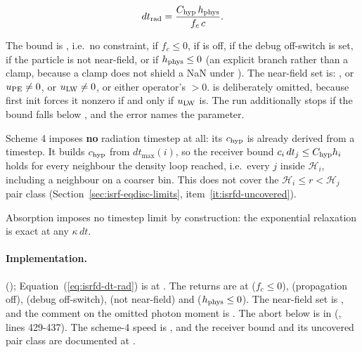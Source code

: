 \begin{equation}
  dt_{\rm rad} = \frac{C_{\rm hyp}\, h_{\rm phys}}{f_c\, c}.
  \label{eq:isrfd-dt-rad}
\end{equation}

The bound is , i.e.\ no
constraint, if $f_c \le 0$, if
 is off, if the debug off-switch is set,
if the particle is not near-field, or if
$h_{\rm phys} \le 0$ (an explicit branch rather than a clamp,
because a clamp does not shield a NaN under ). The near-field
set is: , or
$u_{\rm PE} \ne 0$, or $u_{\rm LW} \ne 0$, or either operator's
 $>0$.  is deliberately
omitted, because first init forces it nonzero if and only if $u_{\rm LW}$ is.
The run additionally stops if the  bound falls below
, and the error names the parameter.

Scheme 4 imposes \textbf{no} radiation timestep at all: its $c_{\rm hyp}$ is
already derived from a timestep. It builds
$c_{\rm hyp}$ from $dt_{\max}(i)$, so the receiver bound
$c_i\, dt_j \le C_{\rm hyp} h_i$ holds for every neighbour the density loop
reached, i.e.\ every $j$ inside $\mathcal{H}_i$,
including a neighbour on a coarser bin.
This does not cover the $\mathcal{H}_i \le r < \mathcal{H}_j$ pair class
(Section~\ref{sec:isrf-eqdisc-limits}, item~\ref{it:isrfd-uncovered}).

Absorption imposes no timestep limit by construction: the exponential relaxation
is exact at any $\kappa\, dt$.

\paragraph{Implementation.} 
(); Equation~(\ref{eq:isrfd-dt-rad}) is at
. The  returns are at
 ($f_c \le 0$),  (propagation off),
 (debug off-switch),  (not near-field) and
 ($h_{\rm phys} \le 0$). The near-field set is
, and the comment on the omitted photon moment is
. The abort below  is in
 (, lines 429-437).
The scheme-4 speed is , and the receiver bound and
its uncovered pair class are documented at .

